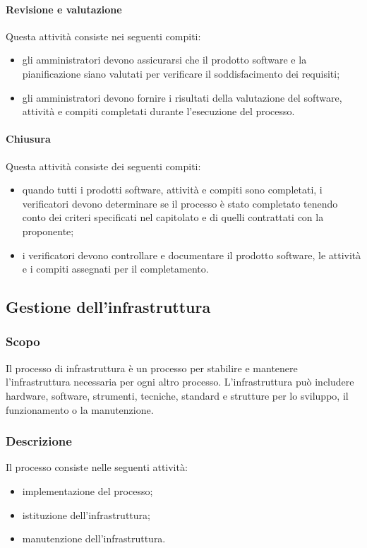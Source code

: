 		\paragraph{Revisione e valutazione}
		Questa attività consiste nei seguenti compiti:
		\begin{itemize}
			\item gli amministratori devono assicurarsi che il prodotto software e la pianificazione siano valutati per verificare il soddisfacimento dei requisiti;
			\item gli amministratori devono fornire i risultati della valutazione del software, attività e compiti completati durante l'esecuzione del processo.
		\end{itemize}
		\paragraph{Chiusura}
		Questa attività consiste dei seguenti compiti:
		\begin{itemize}
			\item quando tutti i prodotti software, attività e compiti sono completati, i verificatori devono determinare se il processo è stato completato tenendo conto dei criteri specificati nel capitolato e di quelli contrattati con la proponente;
			\item i verificatori devono controllare e documentare il prodotto software, le attività e i compiti assegnati per il completamento.
		\end{itemize}
		
		
		\subsection{Gestione dell'infrastruttura}
		\subsubsection{Scopo}
		Il processo di infrastruttura è un processo per stabilire e mantenere l'infrastruttura necessaria per ogni altro processo. L'infrastruttura può includere hardware, software, strumenti, tecniche, standard e strutture per lo sviluppo, il funzionamento o la manutenzione. 
		
		\subsubsection{Descrizione}
		Il processo consiste nelle seguenti attività:
		\begin{itemize}
			\item implementazione del processo;
			\item istituzione dell'infrastruttura;
			\item manutenzione dell'infrastruttura.
		\end{itemize}
		
